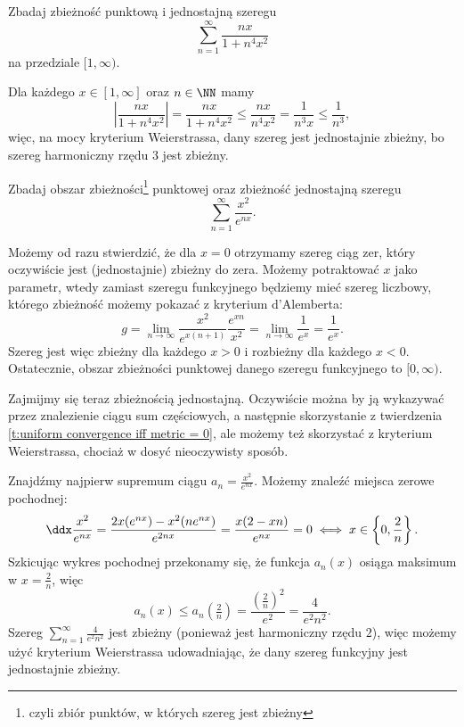 \begin{example}
    Zbadaj zbieżność punktową i jednostajną szeregu
    \[ \sum_{n=1}^\infty \frac{nx}{1+n^4x^2} \]
    na przedziale $[1,\infty)$.
\end{example}
\begin{solution}
    Dla każdego $x \in [1, \infty]$ oraz $n \in \NN$ mamy
    \[ \left|\frac{nx}{1+n^4x^2}\right| = \frac{nx}{1+n^4x^2} \leq \frac{nx}{n^4x^2} = \frac{1}{n^3x} \leq \frac{1}{n^3}, \]
    więc, na mocy kryterium Weierstrassa, dany szereg jest jednostajnie zbieżny, bo szereg harmoniczny rzędu $3$ jest zbieżny.
\end{solution}

\begin{example}
    Zbadaj obszar zbieżności\footnote{czyli zbiór punktów, w których szereg jest zbieżny} punktowej oraz zbieżność jednostajną szeregu
    \[ \sum_{n=1}^\infty \frac{x^2}{e^{nx}}. \]
\end{example}
\begin{solution}
    Możemy od razu stwierdzić, że dla $x = 0$ otrzymamy szereg ciąg zer, który oczywiście jest (jednostajnie) zbieżny do zera. Możemy potraktować $x$ jako parametr, wtedy zamiast szeregu funkcyjnego będziemy mieć szereg liczbowy, którego zbieżność możemy pokazać z kryterium d'Alemberta:
    \[ g = \lim_{n\to\infty} \frac{x^2}{e^{x(n+1)}}\frac{e^{xn}}{x^2} = \lim_{n\to\infty}\frac{1}{e^x} = \frac{1}{e^x}. \]
    Szereg jest więc zbieżny dla każdego $x > 0$ i rozbieżny dla każdego $x < 0$. Ostatecznie, obszar zbieżności punktowej danego szeregu funkcyjnego to $[0,\infty)$.

    Zajmijmy się teraz zbieżnością jednostajną. Oczywiście można by ją wykazywać przez znalezienie ciągu sum częściowych, a następnie skorzystanie z twierdzenia \ref{t:uniform convergence iff metric = 0}, ale możemy też skorzystać z kryterium Weierstrassa, chociaż w dosyć nieoczywisty sposób.

    Znajdźmy najpierw supremum ciągu $a_n = \frac{x^2}{e^{nx}}$. Możemy znaleźć miejsca zerowe pochodnej:
    \[ \ddx \frac{x^2}{e^{nx}} = \frac{2x(e^{nx}) - x^2(ne^{nx})}{e^{2nx}} = \frac{x(2 - xn)}{e^{nx}} = 0 \iff x \in \left\{0, \frac{2}{n}\right\}. \]
    Szkicując wykres pochodnej przekonamy się, że funkcja $a_n(x)$ osiąga maksimum w $x = \frac{2}{n}$, więc
    \[ a_n(x) \leq a_n\left(\tfrac{2}{n}\right) = \frac{\left(\frac{2}{n}\right)^2}{e^2} = \frac{4}{e^2n^2}. \]
    Szereg $\sum_{n=1}^\infty \frac{4}{e^2n^2}$ jest zbieżny (ponieważ jest harmoniczny rzędu $2$), więc możemy użyć kryterium Weierstrassa udowadniając, że dany szereg funkcyjny jest jednostajnie zbieżny.
\end{solution}

